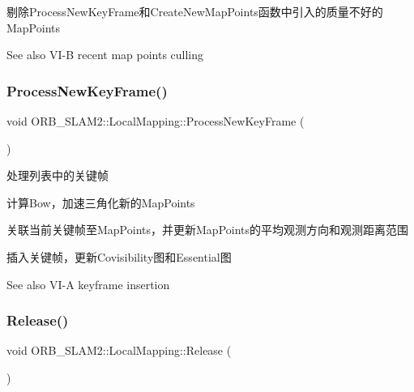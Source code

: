 剔除\+Process\+New\+Key\+Frame和\+Create\+New\+Map\+Points函数中引入的质量不好的\+Map\+Points 

\begin{DoxySeeAlso}{See also}
V\+I-\/B recent map points culling 
\end{DoxySeeAlso}
\mbox{\label{class_o_r_b___s_l_a_m2_1_1_local_mapping_a84eea8f268cce9d919a4906ae634dd22}} 
\subsubsection{\texorpdfstring{Process\+New\+Key\+Frame()}{ProcessNewKeyFrame()}}
{\footnotesize\ttfamily void O\+R\+B\+\_\+\+S\+L\+A\+M2\+::\+Local\+Mapping\+::\+Process\+New\+Key\+Frame (\begin{DoxyParamCaption}{ }\end{DoxyParamCaption})\hspace{0.3cm}{\ttfamily [protected]}}



处理列表中的关键帧 


\begin{DoxyItemize}
\item 计算\+Bow，加速三角化新的\+Map\+Points
\item 关联当前关键帧至\+Map\+Points，并更新\+Map\+Points的平均观测方向和观测距离范围
\item 插入关键帧，更新\+Covisibility图和\+Essential图 \begin{DoxySeeAlso}{See also}
V\+I-\/A keyframe insertion 
\end{DoxySeeAlso}

\end{DoxyItemize}\mbox{\label{class_o_r_b___s_l_a_m2_1_1_local_mapping_aec0950308ba2d828d9dc16d5be34e654}} 
\subsubsection{\texorpdfstring{Release()}{Release()}}
{\footnotesize\ttfamily void O\+R\+B\+\_\+\+S\+L\+A\+M2\+::\+Local\+Mapping\+::\+Release (\begin{DoxyParamCaption}{ }\end{DoxyParamCaption})}

